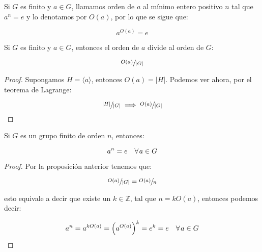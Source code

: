         \begin{definicion}
            Si $G$ es finito y $a \in G$, llamamos orden de $a$ al mínimo entero positivo $n$ tal que $a^n = e$ y lo denotamos por $O(a)$, por lo que se sigue que:

            \begin{equation}
                a^{O(a)} = e
            \end{equation}
        \end{definicion}

        \begin{proposicion}
            Si $G$ es finito y $a \in G$, entonces el orden de $a$ divide al orden de $G$:

            \begin{equation}
                \sfrac{O(a)}{|G|}
            \end{equation}
        \end{proposicion}

        \begin{proof}
            Supongamos $H = \langle a \rangle$, entonces $O(a) = |H|$. Podemos ver ahora, por el teorema de Lagrange:

            \begin{equation*}
                \sfrac{|H|}{|G|} \implies \sfrac{O(a)}{|G|}
            \end{equation*}
        \end{proof}

        \begin{corolario}
            Si $G$ es un grupo finito de orden $n$, entonces:

            \begin{equation}
                a^n = e \quad \forall \mkern2mu a \in G
            \end{equation}
        \end{corolario}

        \begin{proof}
            Por la proposición anterior tenemos que:

            \begin{equation*}
                \sfrac{O(a)}{|G|} = \sfrac{O(a)}{n}
            \end{equation*}

            esto equivale a decir que existe un $k \in \mathbb{Z}$, tal que $n = k O(a)$, entonces podemos decir:

            \begin{equation*}
                a^n = a^{k O(a)} = \left( a^{O(a)} \right)^k = e^k = e \quad \forall \mkern2mu a \in G
            \end{equation*}
        \end{proof}

